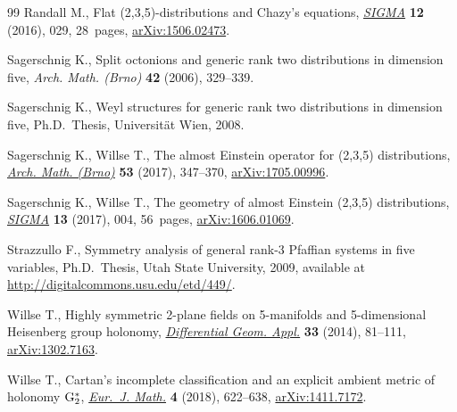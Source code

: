 \documentclass[pdftex]{sigma}
\numberwithin{equation}{section}
\begin{document}
\begin{thebibliography}{99}
Randall M., Flat (2,3,5)-distributions and {C}hazy's equations, \href{https://doi.org/10.3842/SIGMA.2016.029}{\textit{SIGMA}}
 \textbf{12} (2016), 029, 28~pages, \href{https://arxiv.org/abs/1506.02473}{arXiv:1506.02473}.

Sagerschnig K., Split octonions and generic rank two distributions in dimension
 five, \textit{Arch. Math. (Brno)} \textbf{42} (2006), 329--339.

Sagerschnig K., Weyl structures for generic rank two distributions in dimension
 five, Ph.D.~Thesis, {U}niversit\"at Wien, 2008.

Sagerschnig K., Willse T., The almost {E}instein operator for (2,3,5)
 distributions, \href{https://doi.org/10.5817/AM2017-5-347}{\textit{Arch. Math. (Brno)}} \textbf{53} (2017), 347--370,
 \href{https://arxiv.org/abs/1705.00996}{arXiv:1705.00996}.

Sagerschnig K., Willse T., The geometry of almost {E}instein (2,3,5)
 distributions, \href{https://doi.org/10.3842/SIGMA.2017.004}{\textit{SIGMA}} \textbf{13} (2017), 004, 56~pages,
 \href{https://arxiv.org/abs/1606.01069}{arXiv:1606.01069}.

Strazzullo F., Symmetry analysis of general rank-3 {P}faffian systems in five
 variables, Ph.D.~Thesis, {U}tah State University, 2009, available at
 \url{http://digitalcommons.usu.edu/etd/449/}.

Willse T., Highly symmetric 2-plane fields on 5-manifolds and 5-dimensional
 {H}eisenberg group holonomy, \href{https://doi.org/10.1016/j.difgeo.2013.10.010}{\textit{Differential Geom. Appl.}} \textbf{33}
 (2014), 81--111, \href{https://arxiv.org/abs/1302.7163}{arXiv:1302.7163}.

Willse T., Cartan's incomplete classification and an explicit ambient metric of
 holonomy {${\rm G}_2^*$}, \href{https://doi.org/10.1007/s40879-017-0178-9}{\textit{Eur.~J. Math.}} \textbf{4} (2018), 622--638,
 \href{https://arxiv.org/abs/1411.7172}{arXiv:1411.7172}.

\end{thebibliography}\LastPageEnding
\end{document}

